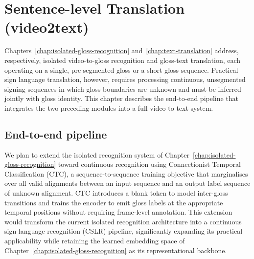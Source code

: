 
\section{Sentence-level Translation (video2text)}
\label{chap:sentence-level-translation}

Chapters~\ref{chap:isolated-gloss-recognition} and~\ref{chap:text-translation}
address, respectively, isolated video-to-gloss recognition and gloss-text
translation, each operating on a single, pre-segmented gloss or a short gloss
sequence. Practical sign language translation, however, requires processing
continuous, unsegmented signing sequences in which gloss boundaries are unknown
and must be inferred jointly with gloss identity. This chapter describes the
end-to-end pipeline that integrates the two preceding modules into a full
video-to-text system.

\subsection{End-to-end pipeline}
\label{sec:sentence-level-pipeline}

We plan to extend the isolated recognition system of
Chapter~\ref{chap:isolated-gloss-recognition} toward continuous recognition
using Connectionist Temporal Classification (CTC), a sequence-to-sequence
training objective that marginalises over all valid alignments between an input
sequence and an output label sequence of unknown alignment. CTC introduces a
blank token to model inter-gloss transitions and trains the encoder to emit
gloss labels at the appropriate temporal positions without requiring
frame-level annotation. This extension would transform the current isolated
recognition architecture into a continuous sign language recognition (CSLR)
pipeline, significantly expanding its practical applicability while retaining
the learned embedding space of Chapter~\ref{chap:isolated-gloss-recognition} as
its representational backbone.


